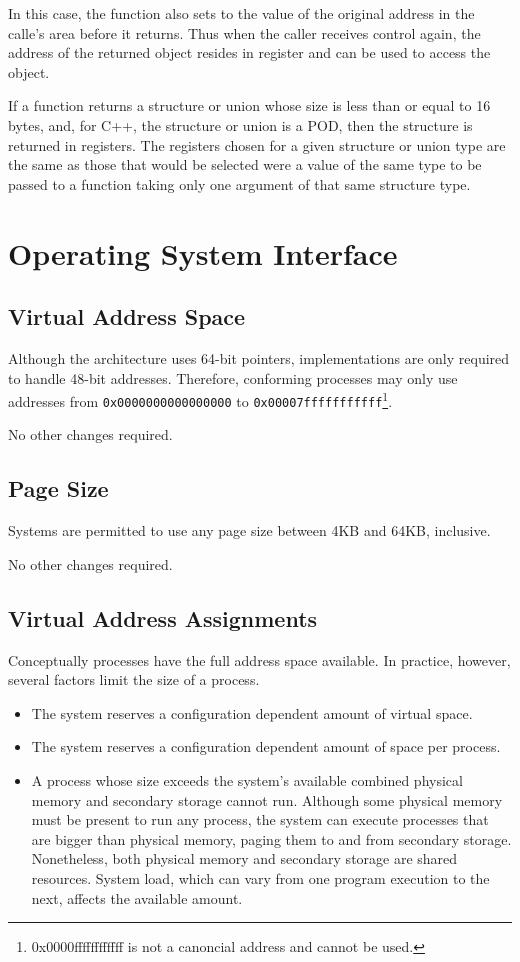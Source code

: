 In this case, the function also sets \RBX to the value of the original
address in the calle's area before it returns.  Thus when the caller
receives control again, the address of the returned object resides in
register \RBX and can be used to access the object.
  
If a function returns a structure or union whose size is less than or
equal to 16 bytes, and, for C++, the structure or union is a POD, then
the structure is returned in registers.  The registers chosen for a
given structure or union type are the same as those that would be
selected were a value of the same type to be passed to a function
taking only one argument of that same structure type.

\section{Operating System Interface}

\subsection{Virtual Address Space}

Although the \xARCH architecture uses 64-bit pointers, implementations
are only required to handle 48-bit addresses.  Therefore, conforming
processes may only use addresses from \texttt{0x0000000000000000} to
\texttt{0x00007fffffffffff}\footnote{0x0000ffffffffffff is not a
  canoncial address and cannot be used.}.

No other changes required.

\subsection{Page Size}

Systems are permitted to use any page size between 4KB and 64KB,
inclusive.

No other changes required.

\subsection{Virtual Address Assignments}

Conceptually processes have the full address space available.
In practice, however, several factors limit the size of a process.
\begin{itemize}
  \item The system reserves a configuration dependent amount of virtual space.
  \item The system reserves a configuration dependent amount of space per
    process.
  \item
    A process whose size exceeds the system's available combined physical
    memory and secondary storage cannot run. Although some physical memory
    must be present to run any process, the system can execute processes that
    are bigger than physical memory, paging them to and from secondary storage.
    Nonetheless, both physical memory and secondary storage are
    shared resources. System load, which can vary from one program execution
    to the next, affects the available amount.
\end{itemize}

